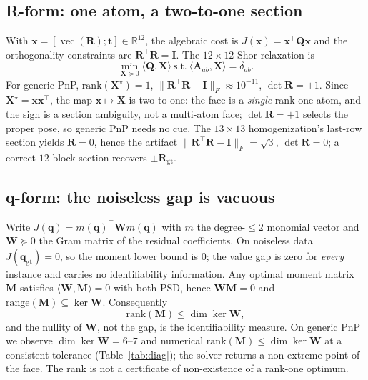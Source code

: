 \documentclass[conference]{IEEEtran}
\newcommand{\R}{\mathbb{R}}
\newcommand{\vect}{\operatorname{vec}}
\newcommand{\bx}{\bm{x}}
\newcommand{\bq}{\bm{q}}
\newcommand{\bR}{\bm{R}}
\newcommand{\bt}{\bm{t}}
\newcommand{\bW}{\bm{W}}
\newcommand{\bA}{\bm{A}}
\newcommand{\bI}{\bm{I}}
\newcommand{\bX}{\bm{X}}
\newcommand{\bM}{\bm{M}}
\newcommand{\bQ}{\bm{Q}}
\begin{document}
\subsection{R-form: one atom, a two-to-one section}
With $\bx=[\vect(\bR);\bt]\in\R^{12}$, the algebraic cost is $J(\bx)=\bx^\top\bQ\bx$ and the orthogonality constraints are $\bR^\top\bR=\bI$. The $12\times12$ Shor relaxation is
\begin{equation}
\min_{\bX\succeq0}\langle\bQ,\bX\rangle
\ \text{s.t.}\ \langle\bA_{ab},\bX\rangle=\delta_{ab}.
\label{eq:rform}
\end{equation}
For generic PnP, $\mathrm{rank}(\bX^\star)=1$, $\|\bR^\top\bR-\bI\|_F\approx10^{-11}$, $\det\bR=\pm1$. Since $\bX^\star=\bx\bx^\top$, the map $\bx\mapsto\bX$ is two-to-one: the face is a \emph{single} rank-one atom, and the sign is a section ambiguity, not a multi-atom face; $\det\bR=+1$ selects the proper pose, so generic PnP needs no cue. The $13\times13$ homogenization's last-row section yields $\bR=0$, hence the artifact $\|\bR^\top\bR-\bI\|_F=\sqrt3$, $\det\bR=0$; a correct $12$-block section recovers $\pm\bR_{\mathrm{gt}}$.

\subsection{q-form: the noiseless gap is vacuous}
Write $J(\bq)=m(\bq)^\top\bW m(\bq)$ with $m$ the degree-$\le2$ monomial vector and $\bW\succeq0$ the Gram matrix of the residual coefficients. On noiseless data $J(\bq_{\mathrm{gt}})=0$, so the moment lower bound is $0$; the value gap is zero for \emph{every} instance and carries no identifiability information. Any optimal moment matrix $\bM$ satisfies $\langle\bW,\bM\rangle=0$ with both PSD, hence $\bW\bM=0$ and $\mathrm{range}(\bM)\subseteq\ker\bW$. Consequently
\begin{equation}
\mathrm{rank}(\bM)\le\dim\ker\bW,
\label{eq:ker}
\end{equation}
and the nullity of $\bW$, not the gap, is the identifiability measure. On generic PnP we observe $\dim\ker\bW=6$--$7$ and numerical $\mathrm{rank}(\bM)\le\dim\ker\bW$ at a consistent tolerance (Table~\ref{tab:diag}); the solver returns a non-extreme point of the face. The rank is not a certificate of non-existence of a rank-one optimum.
\end{document}

